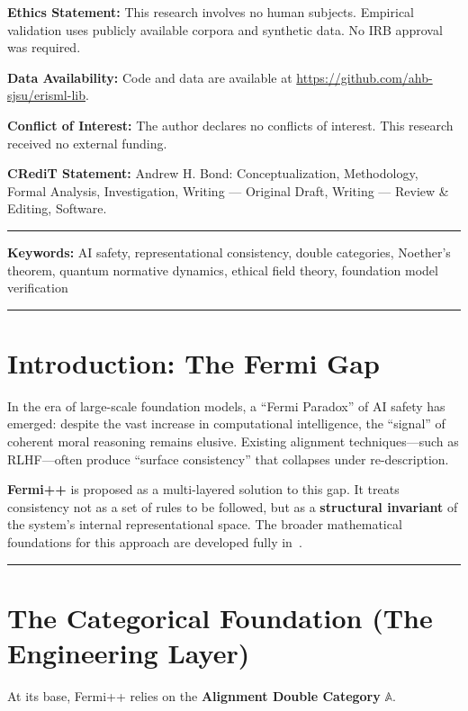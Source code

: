 \documentclass[12pt]{article}
\begin{document}
\begin{titlepage}
\noindent\textbf{Ethics Statement:} This research involves no human subjects. Empirical validation uses publicly available corpora and synthetic data. No IRB approval was required.

\noindent\textbf{Data Availability:} Code and data are available at \url{https://github.com/ahb-sjsu/erisml-lib}.

\noindent\textbf{Conflict of Interest:} The author declares no conflicts of interest. This research received no external funding.

\noindent\textbf{CRediT Statement:} Andrew H. Bond: Conceptualization, Methodology, Formal Analysis, Investigation, Writing --- Original Draft, Writing --- Review \& Editing, Software.
\noindent\rule{\linewidth}{0.4pt}
\normalsize

\end{titlepage}

\noindent\textbf{Keywords:} AI safety, representational consistency, double categories, Noether's theorem, quantum normative dynamics, ethical field theory, foundation model verification

\bigskip
\hrule
\bigskip

\section{Introduction: The Fermi Gap}

In the era of large-scale foundation models, a ``Fermi Paradox'' of AI safety has emerged: despite the vast increase in computational intelligence, the ``signal'' of coherent moral reasoning remains elusive. Existing alignment techniques---such as RLHF---often produce ``surface consistency'' that collapses under re-description.

\textbf{Fermi++} is proposed as a multi-layered solution to this gap. It treats consistency not as a set of rules to be followed, but as a \textbf{structural invariant} of the system's internal representational space. The broader mathematical foundations for this approach are developed fully in~\cite{bond2026ge}.

\bigskip
\hrule
\bigskip

\section{The Categorical Foundation (The Engineering Layer)}

At its base, Fermi++ relies on the \textbf{Alignment Double Category} $\mathbb{A}$.
\end{document}
